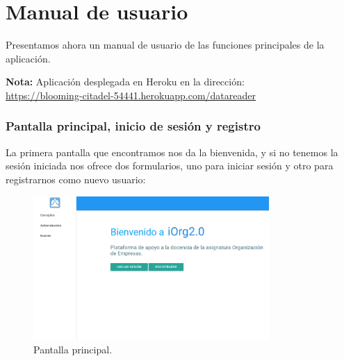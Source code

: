 \chapter{Manual de usuario}

\bigskip
Presentamos ahora un manual de usuario de las funciones principales de la aplicación.

\bigskip
\textbf{Nota:} Aplicación desplegada en Heroku en la dirección: \\
\href{https://blooming-citadel-54441.herokuapp.com/datareader}{https://blooming-citadel-54441.herokuapp.com/datareader}

\subsection{Pantalla principal, inicio de sesión y registro}

\bigskip
La primera pantalla que encontramos nos da la bienvenida, y si no tenemos la sesión iniciada nos ofrece dos formularios, uno para iniciar sesión y otro para registrarnos como nuevo usuario:


\begin{figure}[!ht]
  \begin{center}
     \includegraphics[width=0.8\textwidth]{../images/manual/home.png}
    \caption{Pantalla principal.}
    \label{fig:home}
  \end{center}
\end{figure}


